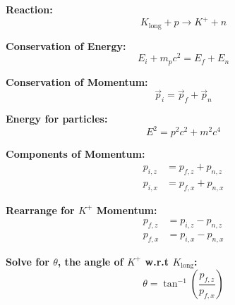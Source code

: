 \documentclass{article}
\begin{document}
\textbf{Reaction:}
\[ K_{\text{long}} + p \rightarrow K^+ + n \]

\textbf{Conservation of Energy:}
\begin{equation}
    E_i + m_p c^2 = E_f + E_n
\end{equation}

\textbf{Conservation of Momentum:}
\begin{equation}
    \vec{p}_i = \vec{p}_f + \vec{p}_n
\end{equation}

\textbf{Energy for particles:}
\begin{equation}
    E^2 = p^2 c^2 + m^2 c^4
\end{equation}

\textbf{Components of Momentum:}
\begin{align}
    p_{i,z} &= p_{f,z} + p_{n,z} \\
    p_{i,x} &= p_{f,x} + p_{n,x}
\end{align}

\textbf{Rearrange for \( K^+ \) Momentum:}
\begin{align}
    p_{f,z} &= p_{i,z} - p_{n,z} \\
    p_{f,x} &= p_{i,x} - p_{n,x}
\end{align}

\textbf{Solve for \( \theta \), the angle of \( K^+ \) w.r.t \( K_{\text{long}} \):}
\begin{equation}
    \theta = \tan^{-1} \left( \frac{p_{f,z}}{p_{f,x}} \right)
\end{equation}
\end{document}
